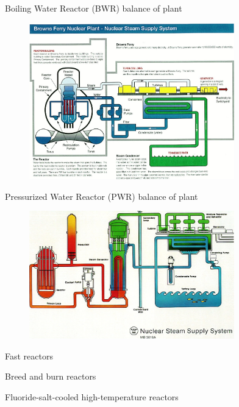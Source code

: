 \documentclass{beamer}
\begin{document}
    \begin{frame}{Boiling Water Reactor (BWR) balance of plant}
        \begin{figure}
            \centering
            \includegraphics[width=24em]{./img/bwrBop.png} \\
            \caption*{}
        \end{figure}
    \end{frame}

    \begin{frame}{Pressurized Water Reactor (PWR) balance of plant}
        \begin{figure}
            \centering
            \includegraphics[width=24em]{./img/pwrBop.png} \\
            \caption*{}
        \end{figure}
    \end{frame}

    \begin{frame}{Fast reactors}
    \end{frame}

    \begin{frame}{Breed and burn reactors}
    \end{frame}

    \begin{frame}{Fluoride-salt-cooled high-temperature reactors}
    \end{frame}
\end{document}
